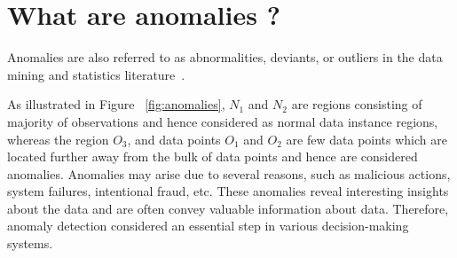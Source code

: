 \section{ What are anomalies ?}
Anomalies  are also referred to as abnormalities, deviants, or outliers in the data mining and statistics literature~\cite{aggarwal2013introduction}.

As illustrated in Figure ~\ref{fig:anomalies}, $N_{1}$ and $N_{2}$ are regions consisting of majority of observations and hence considered as normal data instance regions, whereas the region $O_{3}$, and data points  $O_{1}$ and $O_{2}$  are few data points which are located further away from the bulk of data points and hence are considered anomalies. Anomalies may arise due to several reasons, such as malicious actions, system failures, intentional fraud, etc. These anomalies reveal interesting insights about the data and are often convey valuable information about data. Therefore, anomaly detection considered an essential step in various decision-making systems.


